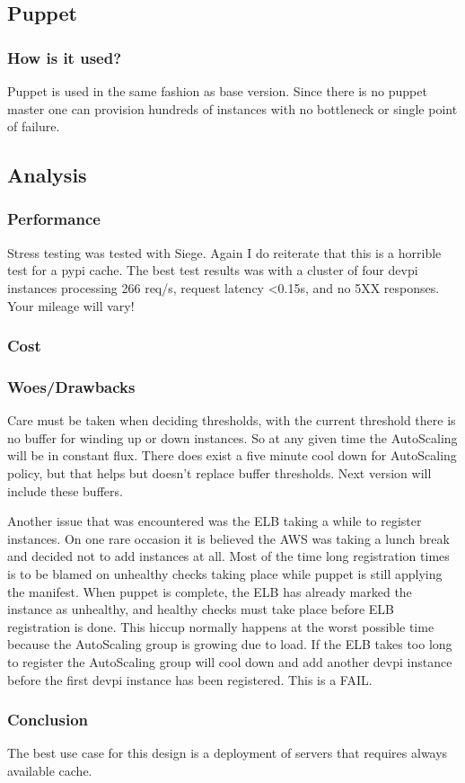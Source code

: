 \documentclass[12pt, letterpaper]{article}
\begin{document}
\subsection{Puppet}
\subsubsection{How is it used?}
Puppet is used in the same fashion as base version. Since there is no puppet master one can provision hundreds of instances
with no bottleneck or single point of failure.

\subsection{Analysis}
\subsubsection{Performance}
Stress testing was tested with Siege. Again I do reiterate that this is a horrible test for a pypi cache. The best test
results was with a cluster of four devpi instances processing 266 req/s, request latency \textless 0.15s, and no 5XX responses.
Your mileage will vary!

\subsubsection{Cost}

\subsubsection{Woes/Drawbacks}
Care must be taken when deciding thresholds, with the current threshold there is no buffer for winding up or down instances. So
at any given time the AutoScaling will be in constant flux. There does exist a five minute cool down for AutoScaling policy, but
that helps but doesn't replace buffer thresholds. Next version will include these buffers.

Another issue that was encountered was the ELB taking a while to register instances. On one rare occasion it is believed the AWS
was taking a lunch break and decided not to add instances at all. Most of the time long registration times is to be blamed
on unhealthy checks taking place while puppet is still applying the manifest. When puppet is complete, the ELB has already marked
the instance as unhealthy, and healthy checks must take place before ELB registration is done. This hiccup normally happens at 
the worst possible time because the AutoScaling group is growing due to load. If the ELB takes too long to register the
AutoScaling group will cool down and add another devpi instance before the first devpi instance has been registered. This is a FAIL.

\subsubsection{Conclusion}
The best use case for this design is a deployment of servers that requires always available cache.
\end{document}
